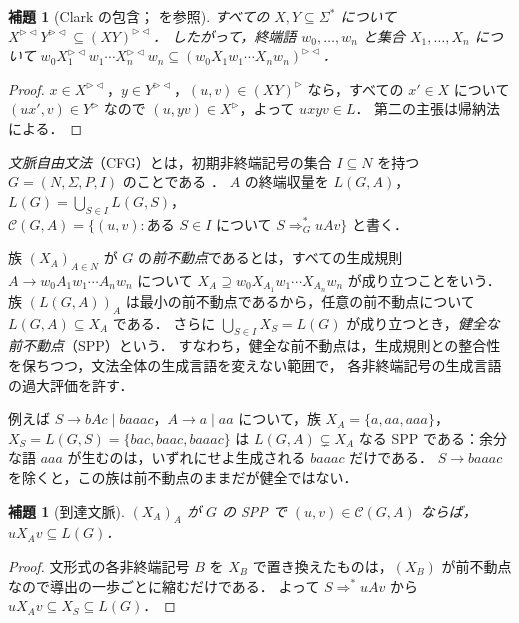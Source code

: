 \documentclass[11pt,a4paper]{ltjsarticle}
\numberwithin{equation}{section}
\theoremstyle{plain}
\newtheorem{lemma}[theorem]{補題}
\theoremstyle{definition}
\theoremstyle{remark}
\theoremstyle{plain}
\newcommand{\R}{^{\rhd}}
\newcommand{\RL}{^{\rhd\lhd}}
\begin{document}
\begin{lemma}[Clark の包含；\citealp{clark2009fg} を参照]\label{lem:clark}
すべての $X,Y\subseteq\Sigma^*$ について $X\RL Y\RL\subseteq(XY)\RL$．
したがって，終端語 $w_0,\dots,w_n$ と集合 $X_1,\dots,X_n$ について
$w_0X_1\RL w_1\cdots X_n\RL w_n\subseteq(w_0X_1w_1\cdots X_nw_n)\RL$．
\end{lemma}
\begin{proof}
$x\in X\RL$，$y\in Y\RL$，$(u,v)\in(XY)\R$ なら，すべての $x'\in X$ について $(ux',v)\in Y\R$ なので $(u,yv)\in X\R$，よって $uxyv\in L$．
第二の主張は帰納法による．
\end{proof}

\emph{文脈自由文法}（CFG）とは，初期非終端記号の集合 $I\subseteq N$ を持つ $G=(N,\Sigma,P,I)$ のことである \citep{ky2017}．
$A$ の終端収量を $L(G,A)$，$L(G)=\bigcup_{S\in I}L(G,S)$，
$\mathcal C(G,A)=\{(u,v): \text{ある } S\in I \text{ について } S\Rightarrow^*_G uAv\}$ と書く．

族 $(X_A)_{A\in N}$ が $G$ の\emph{前不動点}であるとは，すべての生成規則 $A\to w_0A_1w_1\cdots A_nw_n$ について
$X_A\supseteq w_0X_{A_1}w_1\cdots X_{A_n}w_n$ が成り立つことをいう．
族 $(L(G,A))_A$ は最小の前不動点であるから，任意の前不動点について $L(G,A)\subseteq X_A$ である．
さらに $\bigcup_{S\in I}X_S=L(G)$ が成り立つとき，\emph{健全な前不動点}（SPP）という．
すなわち，健全な前不動点は，生成規則との整合性を保ちつつ，文法全体の生成言語を変えない範囲で，
各非終端記号の生成言語の過大評価を許す．

例えば $S\to bAc\mid baaac$，$A\to a\mid aa$ について，族 $X_A=\{a,aa,aaa\}$，$X_S=L(G,S)=\{bac,baac,baaac\}$ は
$L(G,A)\subsetneq X_A$ なる SPP である：余分な語 $aaa$ が生むのは，いずれにせよ生成される $baaac$ だけである．
$S\to baaac$ を除くと，この族は前不動点のままだが健全ではない．

\begin{lemma}[到達文脈]\label{lem:reach}
$(X_A)_A$ が $G$ の SPP で $(u,v)\in\mathcal C(G,A)$ ならば，$uX_Av\subseteq L(G)$．
\end{lemma}
\begin{proof}
文形式の各非終端記号 $B$ を $X_B$ で置き換えたものは，$(X_B)$ が前不動点なので導出の一歩ごとに縮むだけである．
よって $S\Rightarrow^*uAv$ から $uX_Av\subseteq X_S\subseteq L(G)$．
\end{proof}
\end{document}
